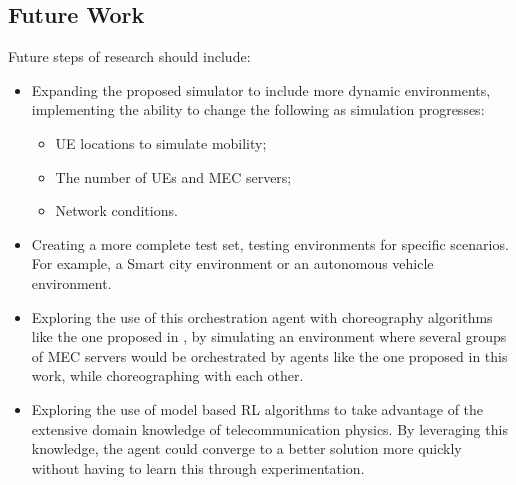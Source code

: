\documentclass[conference]{IEEEtran}
\begin{document}
\subsection{Future Work}
\noindent Future steps of research should include:
\begin{itemize}
    \item Expanding the proposed simulator to include more dynamic environments, implementing the ability to change the following as simulation progresses:
    \begin{itemize}
      \item \acrshort{UE} locations to simulate mobility;
      \item The number of \acrshort{UE}s and \acrshort{MEC} servers;
      \item Network conditions.
    \end{itemize}
    \item Creating a more complete test set, testing environments for specific scenarios. For example, a Smart city environment or an autonomous vehicle environment. 
    \item Exploring the use of this orchestration agent with choreography algorithms like the one proposed in \cite{Lulu}, by simulating an environment where several groups of \acrshort{MEC} servers would be orchestrated by agents like the one proposed in this work, while choreographing with each other.
    \item Exploring the use of model based \acrshort{RL} algorithms to take advantage of the extensive domain knowledge of telecommunication physics. By leveraging this knowledge, the agent could converge to a better solution more quickly without having to learn this through experimentation.
\end{itemize}
\end{document}
